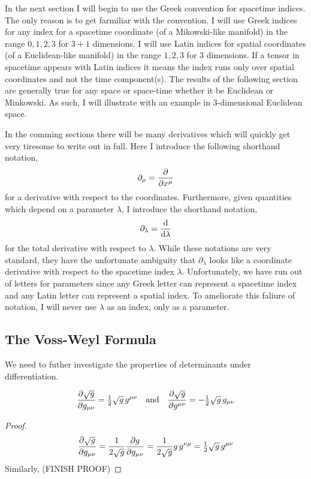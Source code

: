 \documentclass[11pt, a4paper]{article}
\begin{document}
\begin{remark}[Notation]
In the next section I will begin to use the Greek convention for spacetime indices. The only reason is to get farmiliar with the convention. I will use Greek indices for any index for a spacetime coordinate (of a Mikowski-like manifold) in the range $0, 1, 2, 3$ for $3 + 1$ dimensions. I will use Latin indices for spatial coordinates (of a Euclidean-like manifold) in the range $1, 2, 3$ for $3$ dimensions. If a tensor in spacetime appears with Latin indices it means the index runs only over spatial coordinates and not the time component(s). The results of the following section are generally true for any space or space-time whether it be Euclidean or Minkowski. As such, I will illustrate with an example in 3-dimensional Euclidean space. 
\par
In the comming sections there will be many derivatives which will quickly get very tiresome to write out in full. Here I introduce the following shorthand notation,
\[ \partial_\mu = \frac{\partial{}}{\partial{x^\mu}} \]
for a derivative with respect to the coordinates. Furthermore, given quantities which depend on a parameter $\lambda$, I introduce the shorthand notation,
\[ \partial_\lambda = \frac{\mathrm{d}}{\mathrm{d}\lambda}\]
for the total derivative with respect to $\lambda$. While these notations are very standard, they have the unfortunate ambiguity that $\partial_\lambda$ looks like a coordinate derivative with respect to the spacetime index $\lambda$. Unfortunately, we have run out of letters for parameters since any Greek letter can represent a spacetime index and any Latin letter can represent a spatial index. To ameliorate this faliure of notation, I will never use $\lambda$ as an index, only as a parameter. 
\end{remark}

\subsection{The Voss-Weyl Formula}

We need to futher investigate the properties of determinants under differentiation.
\begin{lemma}
\[\frac{\partial{\sqrt{g}}}{\partial{g_{\mu \nu}}} = \tfrac{1}{2} \sqrt{g} \, g^{\mu \nu} \quad \text{and} \quad \frac{\partial{\sqrt{g}}}{\partial{g^{\mu \nu}}} = -\tfrac{1}{2} \sqrt{g} \, g_{\mu \nu} \] 
\end{lemma}
\begin{proof}
\[\frac{\partial{\sqrt{g}}}{\partial{g_{\mu \nu}}} = \frac{1}{2 \sqrt{g}} \frac{\partial{g}}{\partial{g_{\mu \nu}}} = \frac{1}{2 \sqrt{g}} g \, g^{\nu \mu} = \tfrac{1}{2} \sqrt{g} \, g^{\mu \nu}\]
Similarly,
(FINISH PROOF)
\end{proof}
\end{document}
